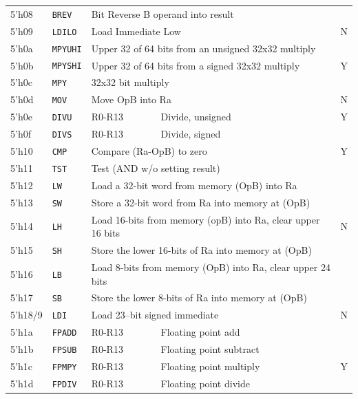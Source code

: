 \documentclass{gqtekspec}
\begin{document}
\begin{table}
\begin{center}
\begin{tabular}{|l|l|l|l|c|}
5'h08 & {\tt BREV} & \multicolumn{2}{l|}{Bit Reverse B operand into result}&  \\\cline{1-4}
5'h09 & {\tt LDILO} & \multicolumn{2}{l|}{Load Immediate Low} & N\\\hline
5'h0a & {\tt MPYUHI} & \multicolumn{2}{l|}{Upper 32 of 64 bits from an unsigned 32x32 multiply} &  \\\cline{1-4}
5'h0b & {\tt MPYSHI} & \multicolumn{2}{l|}{Upper 32 of 64 bits from a signed 32x32 multiply} & Y \\\cline{1-4}
5'h0c & {\tt MPY} & \multicolumn{2}{l|}{32x32 bit multiply} & \\\hline
5'h0d & {\tt MOV} & \multicolumn{2}{l|}{Move OpB into Ra} & N \\\hline
5'h0e & {\tt DIVU} & R0-R13 & Divide, unsigned & Y \\\cline{1-4}
5'h0f & {\tt DIVS} & R0-R13 & Divide, signed &  \\\hline\hline
%
5'h10 & {\tt CMP} & \multicolumn{2}{l|}{Compare (Ra-OpB) to zero} & Y \\\cline{1-4}
5'h11 & {\tt TST} & \multicolumn{2}{l|}{Test (AND w/o setting result)} &   \\\hline
5'h12 & {\tt LW} & \multicolumn{2}{l|}{Load a 32-bit word from memory (OpB) into Ra} & \\\cline{1-4}
5'h13 & {\tt SW} & \multicolumn{2}{l|}{Store a 32-bit word from Ra into memory at (OpB)} &  \\\cline{1-4}
5'h14 & {\tt LH} & \multicolumn{2}{l|}{Load 16-bits from memory (opB) into Ra, clear upper 16 bits} & N \\\cline{1-4}
5'h15 & {\tt SH} & \multicolumn{2}{l|}{Store the lower 16-bits of Ra into memory at (OpB)} &  \\\cline{1-4}
5'h16 & {\tt LB} & \multicolumn{2}{l|}{Load 8-bits from memory (OpB) into Ra, clear upper 24 bits} & \\\cline{1-4}
5'h17 & {\tt SB} & \multicolumn{2}{l|}{Store the lower 8-bits of Ra into memory at (OpB)} &  \\\hline\hline
5'h18/9 & {\tt LDI} & \multicolumn{2}{l|}{Load 23--bit signed immediate} & N \\\hline\hline
5'h1a & {\tt FPADD} & R0-R13 & Floating point add &  \\\cline{1-4}
5'h1b & {\tt FPSUB} & R0-R13 & Floating point subtract &   \\\cline{1-4}
5'h1c & {\tt FPMPY} & R0-R13 & Floating point multiply & Y \\\cline{1-4}
5'h1d & {\tt FPDIV} & R0-R13 & Floating point divide &   \\\cline{1-4}

\end{tabular}
\end{center}
\end{table}
\end{document}

